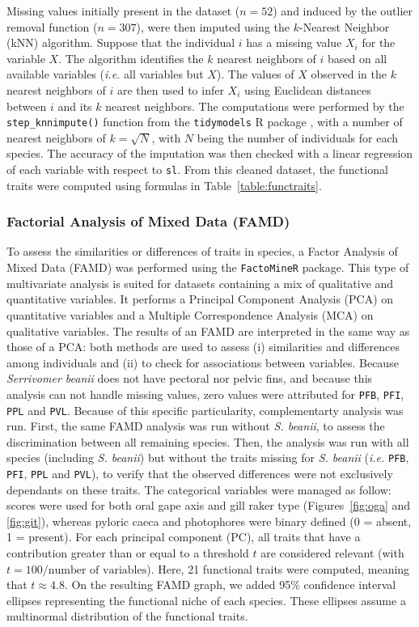 Missing values initially present in the dataset ($n = 52$) and induced by the outlier removal function ($n = 307$), were then imputed using the $k$-Nearest Neighbor (kNN) algorithm. Suppose that the individual $i$ has a missing value $X_i$ for the variable $X$. The algorithm identifies the $k$ nearest neighbors of $i$ based on all available variables (\emph{i.e.} all variables but $X$). The values of $X$ observed in the $k$ nearest neighbors of $i$ are then used to infer $X_i$ using Euclidean distances between $i$ and its $k$ nearest neighbors. The computations were performed by the \texttt{step\_knnimpute()} function from the \texttt{tidymodels} R package \citep{kuhn2020}, with a number of nearest neighbors of $k = \sqrt{N}$, with $N$ being the number of individuals for each species. The accuracy of the imputation was then checked with a linear regression of each variable with respect to \texttt{sl}. From this cleaned dataset, the functional traits were computed using formulas in Table~\ref{table:functraits}. 

\subsubsection{Factorial Analysis of Mixed Data (FAMD)}

To assess the similarities or differences of traits in species, a Factor Analysis of Mixed Data (FAMD) was performed using the \texttt{FactoMineR} package. This type of multivariate analysis is suited for datasets containing a mix of qualitative and quantitative variables. It performs a Principal Component Analysis (PCA) on quantitative variables and a Multiple Correspondence Analysis (MCA) on qualitative variables. The results of an FAMD are interpreted in the same way as those of a PCA: both methods are used to assess (i) similarities and differences among individuals and (ii) to check for associations between variables. Because \textit{Serrivomer beanii} does not have pectoral nor pelvic fins, and because this analysis can not handle missing values, zero values were attributed for \texttt{PFB}, \texttt{PFI}, \texttt{PPL} and \texttt{PVL}. Because of this specific particularity, complementarty analysis was run. First, the same FAMD analysis was run without \textit{S. beanii}, to assess the discrimination between all remaining species. Then, the analysis was run with all species (including \emph{S. beanii}) but without the traits missing for \emph{S. beanii} (\emph{i.e.} \texttt{PFB}, \texttt{PFI}, \texttt{PPL} and \texttt{PVL}), to verify that the observed differences were not exclusively dependants on these traits. The categorical variables were managed as follow: scores were used for both oral gape axis and gill raker type (Figures~\ref{fig:oga} and \ref{fig:git}), whereas pyloric caeca and photophores were binary defined (0 = absent, 1 = present). For each principal component (PC), all traits that have a contribution greater than or equal to a threshold $t$ are considered relevant (with $t = 100 / \text{number of variables}$). Here, 21 functional traits were computed, meaning that $t \approx 4.8$. On the resulting FAMD graph, we added 95\% confidence interval ellipses representing the functional niche of each species. These ellipses assume a multinormal distribution of the functional traits.

